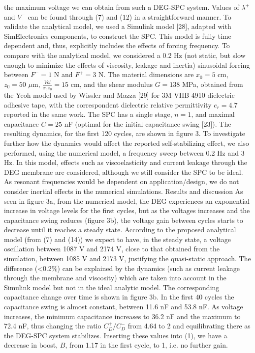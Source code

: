 the maximum voltage we can obtain from such a DEG-SPC system. Values of $\lambda^+$ and $V^-$ can be found through (7) and (12) in a straightforward manner.
To validate the analytical model, we used a Simulink model [28], adapted with SimElectronics components, to construct the SPC. This model is fully time dependent and, thus, explicitly includes the effects of forcing frequency. To compare with the analytical model, we considered a 0.2 Hz (not static, but slow enough to minimize the effects of viscosity, leakage and inertia) sinusoidal forcing between $F^-=1$ N and $F^+=3$ N. The material dimensions are $x_0=5$ cm, $z_0=50$ $\mu$m, $\frac{Vol}{x_0 z_0}=15$ cm, and the shear modulus $G= 138$ MPa, obtained from the Yeoh model used by Wissler and Mazza [29] for 3M VHB 4910 dielectric adhesive tape, with the correspondent dielectric relative permittivity $e_r=4.7$ reported in the same work. The SPC has a single stage, $n=1$, and maximal capacitance $C=25$ nF (optimal for the initial capacitance swing [23]). The resulting dynamics, for the first 120 cycles, are shown in figure 3.
To investigate further how the dynamics would affect the reported self-stabilizing effect, we also performed, using the numerical model, a frequency sweep between 0.2 Hz and 3 Hz. In this model, effects such as viscoelasticity and current leakage through the DEG membrane are considered, although we still consider the SPC to be ideal. As resonant frequencies would be dependent on application/design, we do not consider inertial effects in the numerical simulations.
	Results and discussion
As seen in figure 3a, from the numerical model, the DEG experiences an exponential increase in voltage levels for the first cycles, but as the voltages increases and the capacitance swing reduces (figure 3b), the voltage gain between cycles starts to decrease until it reaches a steady state. According to the proposed analytical model (from (7) and (14)) we expect to have, in the steady state, a voltage oscillation between 1087 V and 2174 V, close to that obtained from the simulation, between 1085 V and 2173 V, justifying the quasi-static approach. The difference (<0.2\%) can be explained by the dynamics (such as current leakage through the membrane and viscosity) which are taken into account in the Simulink model but not in the ideal analytic model. 
The corresponding capacitance change over time is shown in figure 3b. In the first 40 cycles the capacitance swing is almost constant, between 11.6 nF and 53.8 nF. As voltage increases, the minimum capacitance increases to 36.2 nF and the maximum to 72.4 nF, thus changing the ratio $C_D^+/C_D^-$ from 4.64 to 2 and equilibrating there as the DEG-SPC system stabilizes. Inserting these values into (1), we have a decrease in boost, $B$, from 1.17 in the first cycle, to 1, i.e. no further gain. 

